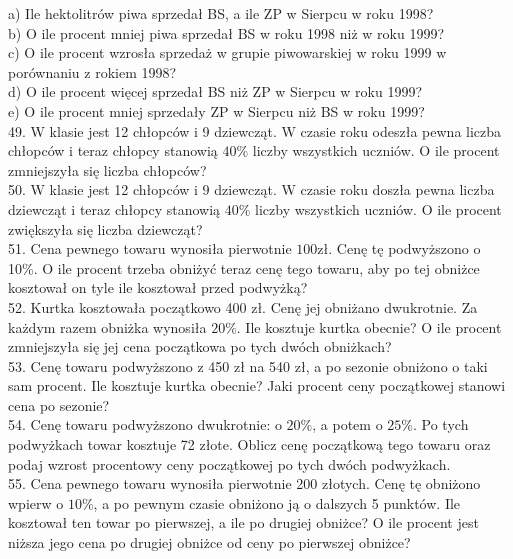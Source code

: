 \documentclass[10pt]{article}
\begin{document}
a) Ile hektolitrów piwa sprzedał BS, a ile ZP w Sierpcu w roku 1998?\\
b) O ile procent mniej piwa sprzedał BS w roku 1998 niż w roku 1999?\\
c) O ile procent wzrosła sprzedaż w grupie piwowarskiej w roku 1999 w porównaniu z rokiem 1998?\\
d) O ile procent więcej sprzedał BS niż ZP w Sierpcu w roku 1999?\\
e) O ile procent mniej sprzedały ZP w Sierpcu niż BS w roku 1999?\\
49. W klasie jest 12 chłopców i 9 dziewcząt. W czasie roku odeszła pewna liczba chłopców i teraz chłopcy stanowią \(40 \%\) liczby wszystkich uczniów. O ile procent zmniejszyła się liczba chłopców?\\
50. W klasie jest 12 chłopców i 9 dziewcząt. W czasie roku doszła pewna liczba dziewcząt i teraz chłopcy stanowią \(40 \%\) liczby wszystkich uczniów. O ile procent zwiększyła się liczba dziewcząt?\\
51. Cena pewnego towaru wynosiła pierwotnie \(100 \mathrm{zł}\). Cenę tę podwyższono o 10\%. O ile procent trzeba obniżyć teraz cenę tego towaru, aby po tej obniżce kosztował on tyle ile kosztował przed podwyżką?\\
52. Kurtka kosztowała początkowo 400 zł. Cenę jej obniżano dwukrotnie. Za każdym razem obniżka wynosiła \(20 \%\). Ile kosztuje kurtka obecnie? O ile procent zmniejszyła się jej cena początkowa po tych dwóch obniżkach?\\
53. Cenę towaru podwyższono z 450 zł na 540 zł, a po sezonie obniżono o taki sam procent. Ile kosztuje kurtka obecnie? Jaki procent ceny początkowej stanowi cena po sezonie?\\
54. Cenę towaru podwyższono dwukrotnie: o \(20 \%\), a potem o \(25 \%\). Po tych podwyżkach towar kosztuje 72 złote. Oblicz cenę początkową tego towaru oraz podaj wzrost procentowy ceny początkowej po tych dwóch podwyżkach.\\
55. Cena pewnego towaru wynosiła pierwotnie 200 złotych. Cenę tę obniżono wpierw o \(10 \%\), a po pewnym czasie obniżono ją o dalszych 5 punktów. Ile kosztował ten towar po pierwszej, a ile po drugiej obniżce? O ile procent jest niższa jego cena po drugiej obniżce od ceny po pierwszej obniżce?
\end{document}
